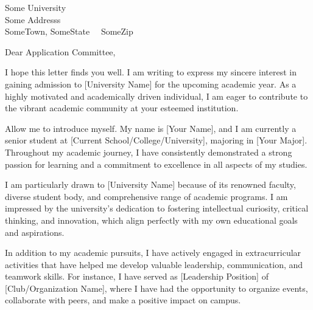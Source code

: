 \documentclass[12pt]{CQMUletter}
\date{\vspace{10mm} \today}
\makeatletter
\def\Where{\hspace{-1.2mm}\textbf{\color{CQMUgreen}
College of Medical Informatics, \\Chongqing Medical University
}}
\def\Address{No. 61, University Town Middle Road, Shapingba District, Chongqing}
\def\CityZip{Chongqing, 401334\\
P.R. China}
\def\Email{\textbf{\color{CQMUgreen}E-mail}: \href{mailto:xxx@stu.cqmu.edu.cn}{xxx@stu.cqmu.edu.cn}}
\def\TEL{\textbf{\color{CQMUgreen}Phone}: +86 xxx xxxx xxxx}
\def\Homepage{\textbf{\color{CQMUgreen}Homepage}: \href{https://www.cqmu.edu.cn/}{https://www.cqmu.edu.cn/}}
\def\newaddress{
\Where\\ 
\Address\\ 
\CityZip\\ 
\TEL\\ 
\Email\\ 
\Homepage 
}
\makeatother
\begin{document}
%
%
%
\begin{letter}{
               Some University\\ 
               Some Addresss\\ 
               SomeTown, SomeState 					       				  		 ~~SomeZip
               }
%

%
\opening{Dear Application Committee,}

\watermark{}{}{}

I hope this letter finds you well. I am writing to express my sincere interest in gaining admission to [University Name] for the upcoming academic year. As a highly motivated and academically driven individual, I am eager to contribute to the vibrant academic community at your esteemed institution.

Allow me to introduce myself. My name is [Your Name], and I am currently a senior student at [Current School/College/University], majoring in [Your Major]. Throughout my academic journey, I have consistently demonstrated a strong passion for learning and a commitment to excellence in all aspects of my studies.

I am particularly drawn to [University Name] because of its renowned faculty, diverse student body, and comprehensive range of academic programs. I am impressed by the university's dedication to fostering intellectual curiosity, critical thinking, and innovation, which align perfectly with my own educational goals and aspirations.

In addition to my academic pursuits, I have actively engaged in extracurricular activities that have helped me develop valuable leadership, communication, and teamwork skills. For instance, I have served as [Leadership Position] of [Club/Organization Name], where I have had the opportunity to organize events, collaborate with peers, and make a positive impact on campus.


\end{letter}
\end{document}
